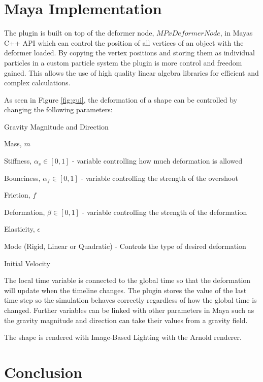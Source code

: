 \section{Maya Implementation}

The plugin is built on top of the deformer node, $MPxDeformerNode$, in Mayas C++ API which can control the position of all vertices of an object with the deformer loaded. 
By copying the vertex positions and storing them as individual particles in a custom particle system the plugin is more control and freedom gained. 
This allows the use of high quality linear algebra libraries for efficient and complex calculations. 

As seen in Figure \ref{fig:gui}, the deformation of a shape can be controlled by changing the following parameters:

\begin{myitemize} 
  \item Gravity Magnitude and Direction 
  \item Mass, $m$
  \item Stiffness, $\alpha_s \in [0,1]$ - variable controlling how much deformation is allowed
  \item Bounciness, $\alpha_f \in [0,1]$ - variable controlling the strength of the overshoot
  \item Friction, $f$
  \item Deformation, $\beta \in [0,1]$ - variable controlling the strength of the deformation
  \item Elasticity, $\epsilon$
  \item Mode (Rigid, Linear or Quadratic) - Controls the type of desired deformation 
  \item Initial Velocity 
\end{myitemize}

The local time variable is connected to the global time so that the deformation will update when the timeline changes. 
The plugin stores the value of the last time step so the simulation behaves correctly regardless of how the global time is changed. 
Further variables can be linked with other parameters in Maya such as the gravity magnitude and direction can take their values from a gravity field.


The shape is rendered with Image-Based Lighting with the Arnold renderer. 

\section{Conclusion}

